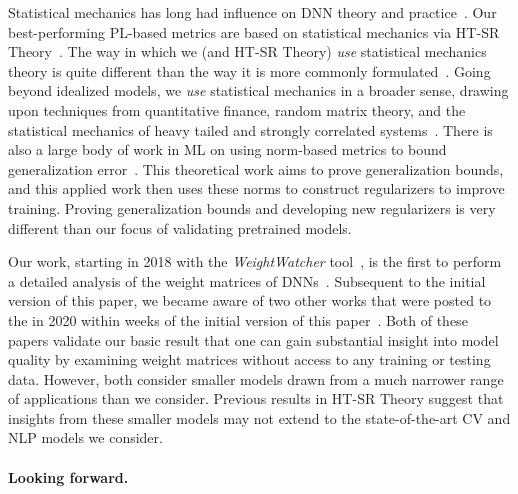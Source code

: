 Statistical mechanics has long had influence on DNN theory and practice~\cite{EB01_BOOK, MM17_TR, BKPx20}.
Our best-performing PL-based metrics are based on statistical mechanics via HT-SR Theory~\cite{MM17_TR, MM18_TR, MM19_HTSR_ICML, MM19_KDD, MM20_SDM}.
The way in which we (and HT-SR Theory) \emph{use} statistical mechanics theory is quite different than the way it is more commonly formulated~\cite{EB01_BOOK, BKPx20}.
Going beyond idealized models, we \emph{use} statistical mechanics in a broader sense, drawing upon techniques from quantitative finance, random matrix theory, and the statistical mechanics of heavy tailed and strongly correlated systems~\cite{BouchaudPotters03, SornetteBook, BP11, bun2017}.
%
There is also a large body of work in ML on using norm-based metrics to bound generalization error~\cite{NTS15, BFT17_TR, LMBx18_TR}.
This theoretical work aims to prove generalization bounds, and this applied work then uses these norms to construct regularizers to improve training.
Proving generalization bounds and developing new regularizers is very different than our focus of validating pretrained models.


Our work, starting in 2018 with the \emph{WeightWatcher} tool~\cite{weightwatcher_package}, is the first to perform a detailed analysis of the weight matrices of DNNs~\cite{MM18_TR, MM19_HTSR_ICML, MM20_SDM}.
Subsequent to the initial version of this paper, we became aware of two other works that were posted to the in 2020 within weeks of the initial version of this paper~\cite{EJRUY20_TR,UKGBT20_TR}.
Both of these papers validate our basic result that one can gain substantial insight into model quality by examining weight matrices without access to any training or testing data.
However, both consider smaller models drawn from a much narrower range of applications than we consider.
Previous results in HT-SR Theory suggest that insights from these smaller models may not extend to the state-of-the-art CV and NLP models we consider.


\paragraph{Looking forward.}


